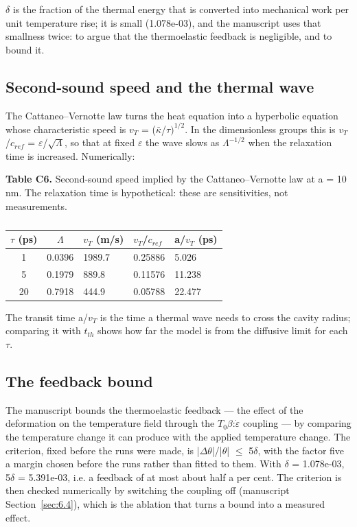 \documentclass[preprint,12pt]{elsarticle}
\begin{document}
$\delta$ is the fraction of the thermal energy that is converted into mechanical work per unit temperature rise; it is small (1.078e-03), and the manuscript uses that smallness twice: to argue that the thermoelastic feedback is negligible, and to bound it.

\subsection{Second-sound speed and the thermal wave}
\label{sec:5.2}

The Cattaneo--Vernotte law turns the heat equation into a hyperbolic equation whose characteristic speed is $v_{T}$ = ($\bar{\kappa}$/$\tau)^{1/2}$. In the dimensionless groups this is $v_{T}$/$c_{ref}$ = $\varepsilon$/$\sqrt \Lambda$, so that at fixed $\varepsilon$ the wave slows as $\Lambda^{-1/2}$ when the relaxation time is increased. Numerically:

\textbf{Table C6.} Second-sound speed implied by the Cattaneo--Vernotte law at a = 10 nm. The relaxation time is hypothetical: these are sensitivities, not measurements.

\begin{table}[htbp]
\centering
\caption{}
\label{tab:?}
\begin{tabular}{cclll}
\toprule
$\tau$ (ps) & $\Lambda$ & $v_{T}$ (m/s) & $v_{T}$/$c_{ref}$ & a/$v_{T}$ (ps) \\
\midrule
1 & 0.0396 & 1989.7 & 0.25886 & 5.026 \\
5 & 0.1979 & 889.8 & 0.11576 & 11.238 \\
20 & 0.7918 & 444.9 & 0.05788 & 22.477 \\
\bottomrule
\end{tabular}
\end{table}

The transit time a/$v_{T}$ is the time a thermal wave needs to cross the cavity radius; comparing it with $t_{th}$ shows how far the model is from the diffusive limit for each $\tau$.

\subsection{The feedback bound}
\label{sec:5.3}

The manuscript bounds the thermoelastic feedback --- the effect of the deformation on the temperature field through the $T_{0}\beta$:$\dot{\varepsilon}$ coupling --- by comparing the temperature change it can produce with the applied temperature change. The criterion, fixed before the runs were made, is |$\Delta \theta$|/|$\theta$| $\leq$ 5$\delta$, with the factor five a margin chosen before the runs rather than fitted to them. With $\delta$ = 1.078e-03, 5$\delta$ = 5.391e-03, i.e. a feedback of at most about half a per cent. The criterion is then checked numerically by switching the coupling off (manuscript Section~\ref{sec:6.4}), which is the ablation that turns a bound into a measured effect.
\end{document}
